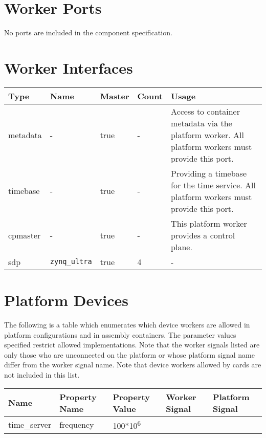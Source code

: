 \documentclass{article}
\begin{document}
\begin{landscape}
\begin{scriptsize}
\begin{tabular}{|p{3cm}|p{1.5cm}|c|c|c|p{1.5cm}|p{1cm}|p{6cm}|}
		\end{tabular}
	\end{scriptsize}

	\section{Worker Ports}
	No ports are included in the component specification.

	\section{Worker Interfaces}
	\begin{scriptsize}
		\begin{tabular}{|M{2cm}|M{2cm}|M{1.5cm}|M{1.5cm}|M{14.5cm}|}
			\hline
			Type       & Name & Master & Count & Usage                  \\
			\hline
			metadata   & -    & true   & -     & Access to container metadata via the platform worker. All platform workers must provide this port. \\
			\hline
			timebase   & -    & true   & -     & Providing a timebase for the time service. All platform workers must provide this port. \\
			\hline
			cpmaster   & - & true   & -     & This platform worker provides a control plane. \\
			\hline
			sdp        & \verb+zynq_ultra+ & true   & 4     & - \\
			\hline
		\end{tabular}
	\end{scriptsize}

\end{landscape}
\pagebreak
	\section{Platform Devices}
	The following is a table which enumerates which device workers are allowed in platform configurations and in assembly containers. The parameter values specified restrict allowed implementations. Note that the worker signals listed are only those who are unconnected on the platform or whose platform signal name differ from the worker signal name. Note that device workers allowed by cards are not included in this list.\\
			\begin{tabular}{|M{3cm}|M{3.5cm}|M{3cm}|M{3cm}|M{3cm}|}
			\hline
			Name                       & Property Name    & Property Value              & Worker Signal & Platform Signal         \\
			\hline
			time\_server               & frequency        & 100*10\textsuperscript{6}   &               &                         \\
			\hline
		\end{tabular}
\end{document}
